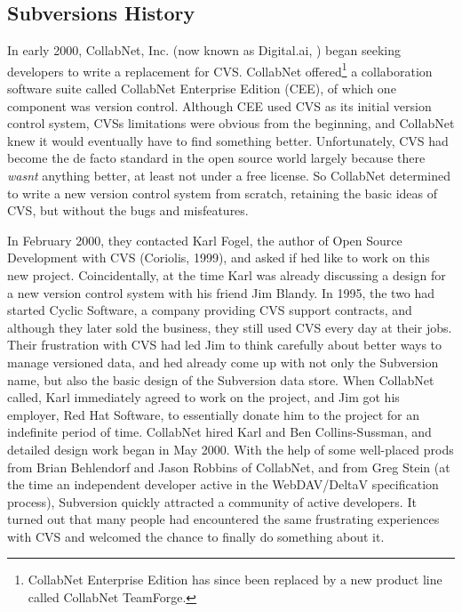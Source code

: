 \subsection{Subversion\textquotesingle s
History}\label{svn.intro.history}

In early 2000, CollabNet, Inc. (now known as Digital.ai,
\href{https://digital.ai}{}) began seeking developers to write a
replacement for CVS. CollabNet offered\footnote{CollabNet Enterprise
  Edition has since been replaced by a new product line called CollabNet
  TeamForge.} a collaboration software suite called CollabNet Enterprise
Edition (CEE), of which one component was version control. Although CEE
used CVS as its initial version control system, CVS\textquotesingle s
limitations were obvious from the beginning, and CollabNet knew it would
eventually have to find something better. Unfortunately, CVS had become
the de facto standard in the open source world largely because there
\emph{wasn\textquotesingle t} anything better, at least not under a free
license. So CollabNet determined to write a new version control system
from scratch, retaining the basic ideas of CVS, but without the bugs and
misfeatures.

In February 2000, they contacted Karl Fogel, the author of Open Source
Development with CVS (Coriolis, 1999), and asked if he\textquotesingle d
like to work on this new project. Coincidentally, at the time Karl was
already discussing a design for a new version control system with his
friend Jim Blandy. In 1995, the two had started Cyclic Software, a
company providing CVS support contracts, and although they later sold
the business, they still used CVS every day at their jobs. Their
frustration with CVS had led Jim to think carefully about better ways to
manage versioned data, and he\textquotesingle d already come up with not
only the Subversion name, but also the basic design of the Subversion
data store. When CollabNet called, Karl immediately agreed to work on
the project, and Jim got his employer, Red Hat Software, to essentially
donate him to the project for an indefinite period of time. CollabNet
hired Karl and Ben Collins-Sussman, and detailed design work began in
May 2000. With the help of some well-placed prods from Brian Behlendorf
and Jason Robbins of CollabNet, and from Greg Stein (at the time an
independent developer active in the WebDAV/DeltaV specification
process), Subversion quickly attracted a community of active developers.
It turned out that many people had encountered the same frustrating
experiences with CVS and welcomed the chance to finally do something
about it.

